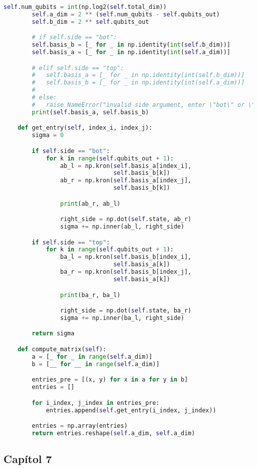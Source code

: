 \begin{lstlisting}[language=Python, caption=Funcions varies]
		self.num_qubits = int(np.log2(self.total_dim))
		self.a_dim = 2 ** (self.num_qubits - self.qubits_out)
		self.b_dim = 2 ** self.qubits_out

		# if self.side == "bot":
		self.basis_b = [_ for _ in np.identity(int(self.b_dim))]
		self.basis_a = [_ for _ in np.identity(int(self.a_dim))]

		# elif self.side == "top":
		#	self.basis_a = [_ for _ in np.identity(int(self.b_dim))]
		#	self.basis_b = [_ for _ in np.identity(int(self.a_dim))]
		#
		# else:
		#	raise NameError("invalid side argument, enter \"bot\" or \"top\"")
		print(self.basis_a, self.basis_b)

	def get_entry(self, index_i, index_j):
		sigma = 0

		if self.side == "bot":
			for k in range(self.qubits_out + 1):
				ab_l = np.kron(self.basis_a[index_i],
						   	   self.basis_b[k])
				ab_r = np.kron(self.basis_a[index_j],
						   	   self.basis_b[k])

				print(ab_r, ab_l)

				right_side = np.dot(self.state, ab_r)
				sigma += np.inner(ab_l, right_side)

		if self.side == "top":
			for k in range(self.qubits_out + 1):
				ba_l = np.kron(self.basis_b[index_i],
							   self.basis_a[k])
				ba_r = np.kron(self.basis_b[index_j],
							   self.basis_a[k])

				print(ba_r, ba_l)

				right_side = np.dot(self.state, ba_r)
				sigma += np.inner(ba_l, right_side)

		return sigma

	def compute_matrix(self):
		a = [_ for _ in range(self.a_dim)]
		b = [__ for __ in range(self.a_dim)]

		entries_pre = [(x, y) for x in a for y in b]
		entries = []

		for i_index, j_index in entries_pre:
			entries.append(self.get_entry(i_index, j_index))

		entries = np.array(entries)
		return entries.reshape(self.a_dim, self.a_dim)

\end{lstlisting}

\subsection{Capítol 7}
